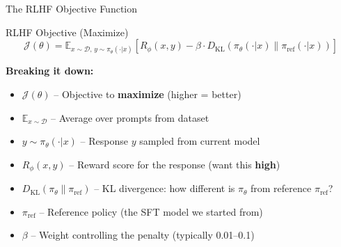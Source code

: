 \documentclass[aspectratio=169,11pt]{beamer}
\newcommand{\highlight}[1]{\textcolor{accentorange}{\textbf{#1}}}
\newcommand{\important}[1]{\textcolor{primaryblue}{\textbf{#1}}}
\begin{document}
\begin{frame}{The RLHF Objective Function}
\begin{block}{RLHF Objective (Maximize)}
\[
\mathcal{J}(\theta) = \mathbb{E}_{x \sim \mathcal{D},\, y \sim \pi_\theta(\cdot|x)} \left[ R_\phi(x, y) - \beta \cdot D_{\text{KL}}\left(\pi_\theta(\cdot|x) \| \pi_{\text{ref}}(\cdot|x)\right) \right]
\]
\end{block}

\textbf{Breaking it down:}
\begin{itemize}
    \item $\mathcal{J}(\theta)$ -- Objective to \important{maximize} (higher = better)
    \item $\mathbb{E}_{x \sim \mathcal{D}}$ -- Average over prompts from dataset
    \item $y \sim \pi_\theta(\cdot|x)$ -- Response $y$ sampled from current model
    \item $R_\phi(x, y)$ -- Reward score for the response (want this \highlight{high})
    \item $D_{\text{KL}}(\pi_\theta \| \pi_{\text{ref}})$ -- KL divergence: how different is $\pi_\theta$ from reference $\pi_{\text{ref}}$?
    \item $\pi_{\text{ref}}$ -- Reference policy (the SFT model we started from)
    \item $\beta$ -- Weight controlling the penalty (typically 0.01--0.1)
\end{itemize}
\end{frame}
\end{document}
